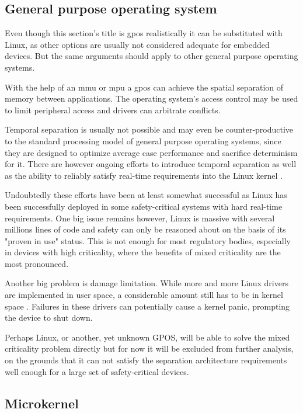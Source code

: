 \subsection{General purpose operating system}
Even though this section's title is \acrfull{gpos} realistically it can be substituted with Linux, as other options are usually not considered adequate for embedded devices. But the same arguments should apply to other general purpose operating systems.

With the help of an \acrfull{mmu} or \acrfull{mpu}  a \acrshort{gpos} can achieve the spatial separation of memory between applications. The operating system's access control may be used to limit peripheral access and drivers can arbitrate conflicts. 

Temporal separation is usually not possible and may even be counter-productive to the standard processing model of general purpose operating systems, since they are designed to optimize average case performance and sacrifice determinism for it. There are however ongoing efforts to introduce temporal separation as well as the ability to reliably satisfy real-time requirements into the Linux kernel \cite{SiroArthur.2007}.

Undoubtedly these efforts have been at least somewhat successful as Linux has been successfully deployed in some safety-critical systems with hard real-time requirements. One big issue remains however, Linux is massive with several millions lines of code and safety can only be reasoned about on the basis of its "proven in use" status. This is not enough for most regulatory bodies, especially in devices with high criticality, where the benefits of mixed criticality are the most pronounced.

Another big problem is damage limitation. While more and more Linux drivers are implemented in user space, a considerable amount still has to be in kernel space . Failures in these drivers can potentially cause a kernel panic, prompting the device to shut down. 

Perhaps Linux, or another, yet unknown GPOS, will be able to solve the mixed criticality problem directly but for now it will be excluded from further analysis, on the grounds that it can not satisfy the separation architecture requirements well enough for a large set of safety-critical devices.
\subsection{Microkernel}

